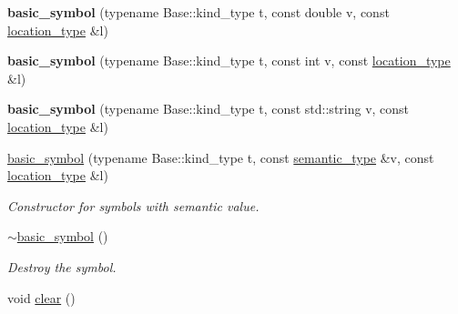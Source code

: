 \begin{DoxyCompactItemize}
\item 
{\bfseries basic\+\_\+symbol} (typename Base\+::kind\+\_\+type t, const double v, const \hyperlink{classEzAquarii_1_1Parser_acc4b937a827f1be285bf28ec90eeb125}{location\+\_\+type} \&l)\hypertarget{structEzAquarii_1_1Parser_1_1basic__symbol_a38c2d31b6c881387ac382235fd1c46db}{}\label{structEzAquarii_1_1Parser_1_1basic__symbol_a38c2d31b6c881387ac382235fd1c46db}

\item 
{\bfseries basic\+\_\+symbol} (typename Base\+::kind\+\_\+type t, const int v, const \hyperlink{classEzAquarii_1_1Parser_acc4b937a827f1be285bf28ec90eeb125}{location\+\_\+type} \&l)\hypertarget{structEzAquarii_1_1Parser_1_1basic__symbol_a7b39bce7e835ac70a49dbc8747250ce9}{}\label{structEzAquarii_1_1Parser_1_1basic__symbol_a7b39bce7e835ac70a49dbc8747250ce9}

\item 
{\bfseries basic\+\_\+symbol} (typename Base\+::kind\+\_\+type t, const std\+::string v, const \hyperlink{classEzAquarii_1_1Parser_acc4b937a827f1be285bf28ec90eeb125}{location\+\_\+type} \&l)\hypertarget{structEzAquarii_1_1Parser_1_1basic__symbol_a79bff82f60d146ea55733ed85c39071c}{}\label{structEzAquarii_1_1Parser_1_1basic__symbol_a79bff82f60d146ea55733ed85c39071c}

\item 
\hyperlink{structEzAquarii_1_1Parser_1_1basic__symbol_aef39b38d4b4b7fb960becd6d2c488319}{basic\+\_\+symbol} (typename Base\+::kind\+\_\+type t, const \hyperlink{classEzAquarii_1_1Parser_aaaaae6127b81aac6e8be99c12433702e}{semantic\+\_\+type} \&v, const \hyperlink{classEzAquarii_1_1Parser_acc4b937a827f1be285bf28ec90eeb125}{location\+\_\+type} \&l)\hypertarget{structEzAquarii_1_1Parser_1_1basic__symbol_aef39b38d4b4b7fb960becd6d2c488319}{}\label{structEzAquarii_1_1Parser_1_1basic__symbol_aef39b38d4b4b7fb960becd6d2c488319}

\begin{DoxyCompactList}\small\item\em Constructor for symbols with semantic value. \end{DoxyCompactList}\item 
\hyperlink{structEzAquarii_1_1Parser_1_1basic__symbol_a81d711ad681f7aee3cb84e2a9063b4ca}{$\sim$basic\+\_\+symbol} ()\hypertarget{structEzAquarii_1_1Parser_1_1basic__symbol_a81d711ad681f7aee3cb84e2a9063b4ca}{}\label{structEzAquarii_1_1Parser_1_1basic__symbol_a81d711ad681f7aee3cb84e2a9063b4ca}

\begin{DoxyCompactList}\small\item\em Destroy the symbol. \end{DoxyCompactList}\item 
void \hyperlink{structEzAquarii_1_1Parser_1_1basic__symbol_a425715a1798d93c5a35f347af17e993b}{clear} ()\hypertarget{structEzAquarii_1_1Parser_1_1basic__symbol_a425715a1798d93c5a35f347af17e993b}{}\label{structEzAquarii_1_1Parser_1_1basic__symbol_a425715a1798d93c5a35f347af17e993b}


\end{DoxyCompactItemize}
